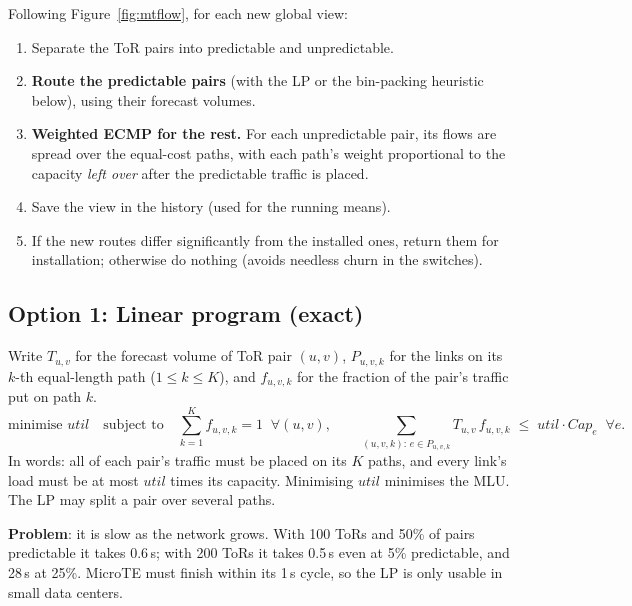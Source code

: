 Following Figure~\ref{fig:mtflow}, for each new global view:
\begin{enumerate}
  \item Separate the ToR pairs into predictable and unpredictable.
  \item \textbf{Route the predictable pairs} (with the LP or the bin-packing heuristic below), using their forecast volumes.
  \item \textbf{Weighted ECMP for the rest.} For each unpredictable pair, its flows are spread over the equal-cost paths, with each path's
        weight proportional to the capacity \emph{left over} after the predictable traffic is placed.
  \item Save the view in the history (used for the running means).
  \item If the new routes differ significantly from the installed ones, return them for installation; otherwise do nothing (avoids
        needless churn in the switches).
\end{enumerate}

\subsection{Option 1: Linear program (exact)}
Write $T_{u,v}$ for the forecast volume of ToR pair $(u,v)$, $P_{u,v,k}$ for the links on its $k$-th equal-length path ($1\le k\le K$),
and $f_{u,v,k}$ for the fraction of the pair's traffic put on path $k$.
\[
\text{minimise } util \quad\text{subject to}\quad
\sum_{k=1}^{K} f_{u,v,k} = 1 \;\;\forall (u,v), \qquad
\sum_{(u,v,k):\, e \in P_{u,v,k}} T_{u,v}\, f_{u,v,k} \;\le\; util \cdot Cap_e \;\;\forall e.
\]
In words: all of each pair's traffic must be placed on its $K$ paths, and every link's load must be at most $util$ times its capacity.
Minimising $util$ minimises the MLU. The LP may split a pair over several paths.

\textbf{Problem}: it is slow as the network grows. With 100 ToRs and 50\% of pairs predictable it takes 0.6\,s; with 200 ToRs it takes 0.5\,s
even at 5\% predictable, and 28\,s at 25\%. MicroTE must finish within its 1\,s cycle, so the LP is only usable in small data centers.

